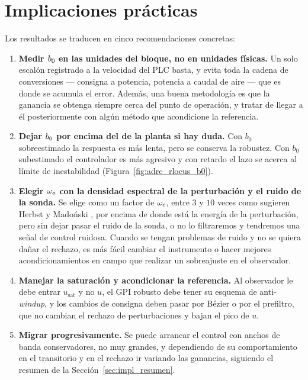 \section{Implicaciones prácticas}
\label{sec:implicaciones}


Los resultados se traducen en cinco recomendaciones concretas:

\begin{enumerate}
  \item \textbf{Medir $b_{0}$ en las unidades del bloque, no en unidades
  físicas.} Un solo escalón registrado a la velocidad del PLC basta, y evita
  toda la cadena de conversiones --- consigna a potencia, potencia a caudal de
  aire --- que es donde se acumula el error. Además, una buena metodología es que la ganancia se obtenga
  siempre cerca del punto de operación, y tratar de llegar a él posteriormente con
  algún método que acondicione la referencia.

  \item \textbf{Dejar $b_{0}$ por encima del de la planta si hay duda.} Con $b_0$ sobreestimado la
  respuesta es más lenta, pero se conserva la robustez. Con $b_0$ subestimado el controlador es más
  agresivo y con retardo el lazo se acerca al límite de inestabilidad (Figura~\ref{fig:adrc_rlocus_b0}).

  \item \textbf{Elegir $\omega_{o}$ con la densidad espectral de la perturbación y el ruido de la sonda.} Se elige como
  un factor de $\omega_{c}$, entre $3$ y $10$ veces como sugieren Herbst y Madoński
  \cite[sec.~3.3]{herbst2024adrc}, por encima de donde está la energía de la perturbación, pero sin
  dejar pasar el ruido de la sonda, o no lo filtraremos y tendremos una señal de control ruidosa. Cuando
  se tengan problemas de ruido y no se quiera dañar el rechazo, es más fácil cambiar el
  instrumento o hacer mejores acondicionamientos en campo que realizar un sobreajuste en el observador.

  \item \textbf{Manejar la saturación y acondicionar la referencia.} Al observador le debe entrar
  $u_{\mathrm{sat}}$ y no $u$, el GPI robusto debe tener su esquema de anti-\emph{windup}, y los cambios de
  consigna deben pasar por Bézier o por el prefiltro, que no cambian el rechazo de perturbaciones y
  bajan el pico de $u$.

  \item \textbf{Migrar progresivamente.} Se puede arrancar el control con anchos de banda
  conservadores, no muy grandes, y dependiendo de su comportamiento en el transitorio y en el rechazo ir
  variando las ganancias, siguiendo el resumen de la Sección~\ref{sec:impl_resumen}.
\end{enumerate}
